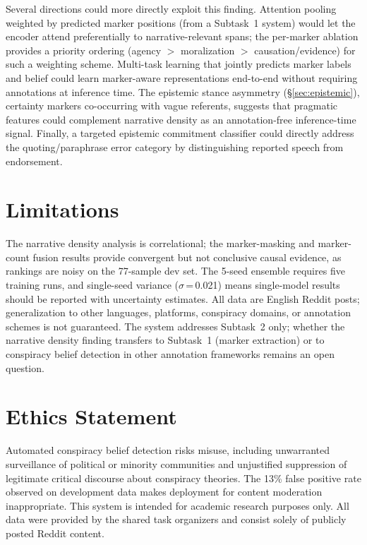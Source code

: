 \documentclass[11pt]{article}
\begin{document}
Several directions could more directly exploit this finding.
Attention pooling weighted by predicted marker positions (from a Subtask~1 system) would let the encoder attend preferentially to narrative-relevant spans; the per-marker ablation provides a priority ordering (agency $>$ moralization $>$ causation/evidence) for such a weighting scheme.
Multi-task learning that jointly predicts marker labels and belief could learn marker-aware representations end-to-end without requiring annotations at inference time.
The epistemic stance asymmetry (\S\ref{sec:epistemic}), certainty markers co-occurring with vague referents, suggests that pragmatic features could complement narrative density as an annotation-free inference-time signal.
Finally, a targeted epistemic commitment classifier could directly address the quoting/paraphrase error category by distinguishing reported speech from endorsement.

\section*{Limitations}

The narrative density analysis is correlational; the marker-masking and marker-count fusion results provide convergent but not conclusive causal evidence, as rankings are noisy on the 77-sample dev set.
The 5-seed ensemble requires five training runs, and single-seed variance ($\sigma$\,=\,0.021) means single-model results should be reported with uncertainty estimates.
All data are English Reddit posts; generalization to other languages, platforms, conspiracy domains, or annotation schemes is not guaranteed.
The system addresses Subtask~2 only; whether the narrative density finding transfers to Subtask~1 (marker extraction) or to conspiracy belief detection in other annotation frameworks remains an open question.

\section*{Ethics Statement}

Automated conspiracy belief detection risks misuse, including unwarranted surveillance of political or minority communities and unjustified suppression of legitimate critical discourse about conspiracy theories.
The 13\% false positive rate observed on development data makes deployment for content moderation inappropriate.
This system is intended for academic research purposes only.
All data were provided by the shared task organizers and consist solely of publicly posted Reddit content.
\end{document}
